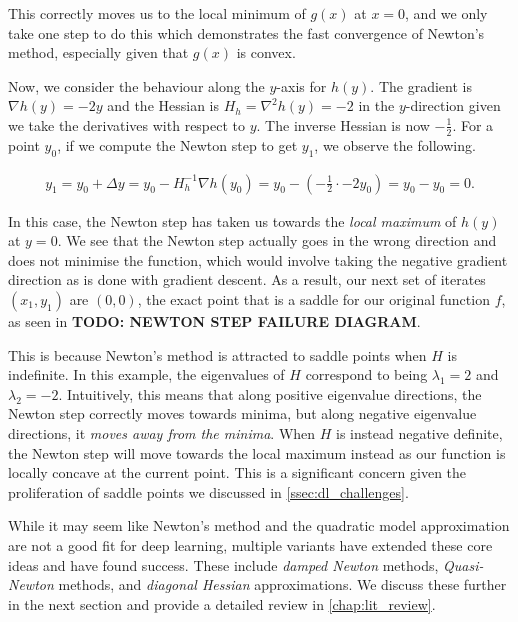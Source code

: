 This correctly moves us to the local minimum of $g(x)$ at $x = 0$, and we only take one step to do this which demonstrates the fast convergence of Newton's method, especially given that $g(x)$ is convex. 



Now, we consider the behaviour along the $y$-axis for $h(y)$. The gradient is $\nabla h(y) = -2y$ and the Hessian is $H_h = \nabla^2 h(y) = -2$ in the $y$-direction given we take the derivatives with respect to $y$. The inverse Hessian is now $-\frac{1}{2}$. For a point $y_0$, if we compute the Newton step to get $y_1$, we observe the following.

\begin{align}

    y_1 = y_0 + \Delta y = y_0 - H_h^{-1} \nabla h(y_0) = y_0 - \left(-\frac{1}{2} \cdot -2 y_0\right) = y_0 - y_0 = 0.

\end{align}

In this case, the Newton step has taken us towards the \textit{local maximum} of $h(y)$ at $y = 0$. We see that the Newton step actually goes in the wrong direction and does not minimise the function, which would involve taking the negative gradient direction as is done with gradient descent. As a result, our next set of iterates $(x_1, y_1)$ are $(0, 0)$, the exact point that is a saddle for our original function $f$, as seen in \textbf{TODO: NEWTON STEP FAILURE DIAGRAM}.



This is because Newton's method is attracted to saddle points when $H$ is indefinite. In this example, the eigenvalues of $H$ correspond to being $\lambda_1 = 2$ and $\lambda_2 = -2$. Intuitively, this means that along positive eigenvalue directions, the Newton step correctly moves towards minima, but along negative eigenvalue directions, it \textit{moves away from the minima}. When $H$ is instead negative definite, the Newton step will move towards the local maximum instead as our function is locally concave at the current point. This is a significant concern given the proliferation of saddle points we discussed in \cref{ssec:dl_challenges}. 



While it may seem like Newton's method and the quadratic model approximation are not a good fit for deep learning, multiple variants have extended these core ideas and have found success. These include \textit{damped Newton} methods, \textit{Quasi-Newton} methods, and \textit{diagonal Hessian} approximations. We discuss these further in the next section and provide a detailed review in \cref{chap:lit_review}.



